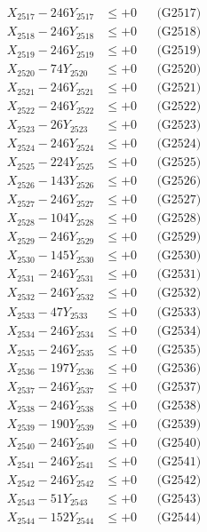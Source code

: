 \documentclass[a4paper,10pt]{article}
\begin{document}
{\begin{align}
X_{2517} - 246Y_{2517} &\leq +0 && \text{(G2517)} \\
X_{2518} - 246Y_{2518} &\leq +0 && \text{(G2518)} \\
X_{2519} - 246Y_{2519} &\leq +0 && \text{(G2519)} \\
X_{2520} - 74Y_{2520} &\leq +0 && \text{(G2520)} \\
\allowbreak
X_{2521} - 246Y_{2521} &\leq +0 && \text{(G2521)} \\
X_{2522} - 246Y_{2522} &\leq +0 && \text{(G2522)} \\
X_{2523} - 26Y_{2523} &\leq +0 && \text{(G2523)} \\
X_{2524} - 246Y_{2524} &\leq +0 && \text{(G2524)} \\
X_{2525} - 224Y_{2525} &\leq +0 && \text{(G2525)} \\
X_{2526} - 143Y_{2526} &\leq +0 && \text{(G2526)} \\
X_{2527} - 246Y_{2527} &\leq +0 && \text{(G2527)} \\
X_{2528} - 104Y_{2528} &\leq +0 && \text{(G2528)} \\
X_{2529} - 246Y_{2529} &\leq +0 && \text{(G2529)} \\
X_{2530} - 145Y_{2530} &\leq +0 && \text{(G2530)} \\
\allowbreak
X_{2531} - 246Y_{2531} &\leq +0 && \text{(G2531)} \\
X_{2532} - 246Y_{2532} &\leq +0 && \text{(G2532)} \\
X_{2533} - 47Y_{2533} &\leq +0 && \text{(G2533)} \\
X_{2534} - 246Y_{2534} &\leq +0 && \text{(G2534)} \\
X_{2535} - 246Y_{2535} &\leq +0 && \text{(G2535)} \\
X_{2536} - 197Y_{2536} &\leq +0 && \text{(G2536)} \\
X_{2537} - 246Y_{2537} &\leq +0 && \text{(G2537)} \\
X_{2538} - 246Y_{2538} &\leq +0 && \text{(G2538)} \\
X_{2539} - 190Y_{2539} &\leq +0 && \text{(G2539)} \\
X_{2540} - 246Y_{2540} &\leq +0 && \text{(G2540)} \\
\allowbreak
X_{2541} - 246Y_{2541} &\leq +0 && \text{(G2541)} \\
X_{2542} - 246Y_{2542} &\leq +0 && \text{(G2542)} \\
X_{2543} - 51Y_{2543} &\leq +0 && \text{(G2543)} \\
X_{2544} - 152Y_{2544} &\leq +0 && \text{(G2544)} \\

\end{align}}
\end{document}
